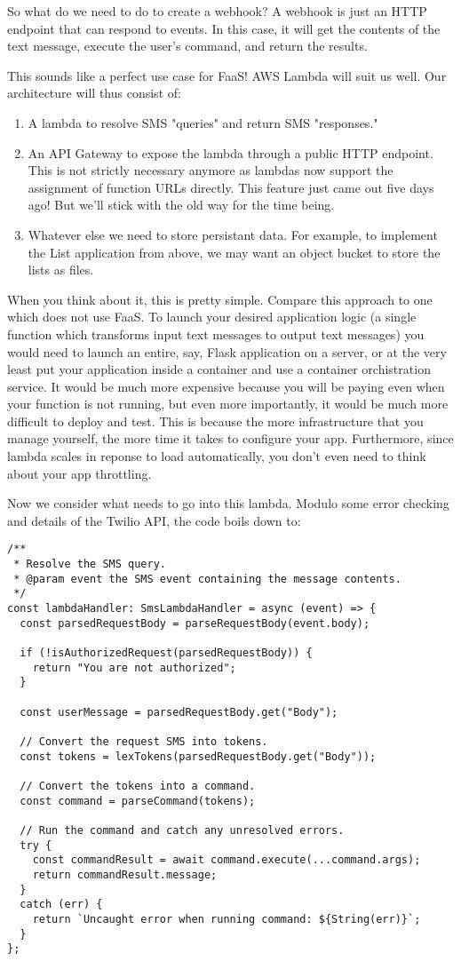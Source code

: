 \documentclass{article}
\begin{document}
So what do we need to do to create a webhook?
A webhook is just an HTTP endpoint that can respond to events.
In this case, it will get the contents of the text message, execute the user's command, and return the results.

This sounds like a perfect use case for FaaS!
AWS Lambda will suit us well.
Our architecture will thus consist of:

\begin{enumerate}
  \item A lambda to resolve SMS "queries" and return SMS "responses."
  \item An API Gateway to expose the lambda through a public HTTP endpoint. This is not strictly necessary anymore as lambdas now support the assignment of function URLs directly. This feature just came out five days ago! But we'll stick with the old way for the time being.
  \item Whatever else we need to store persistant data.
    For example, to implement the List application from above, we may want an object bucket to store the lists as files.
\end{enumerate}

When you think about it, this is pretty simple.
Compare this approach to one which does not use FaaS.
To launch your desired application logic (a single function which transforms input text messages to output text messages) you would need to launch an entire, say, Flask application on a server, or at the very least put your application inside a container and use a container orchistration service.
It would be much more expensive because you will be paying even when your function is not running, but even more importantly, it would be much more difficult to deploy and test.
This is because the more infrastructure that you manage yourself, the more time it takes to configure your app.
Furthermore, since lambda scales in reponse to load automatically, you don't even need to think about your app throttling.

Now we consider what needs to go into this lambda.
Modulo some error checking and details of the Twilio API, the code boils down to:

\begin{verbatim}
/**
 * Resolve the SMS query.
 * @param event the SMS event containing the message contents.
 */
const lambdaHandler: SmsLambdaHandler = async (event) => {
  const parsedRequestBody = parseRequestBody(event.body);

  if (!isAuthorizedRequest(parsedRequestBody)) {
    return "You are not authorized";
  }

  const userMessage = parsedRequestBody.get("Body");

  // Convert the request SMS into tokens.
  const tokens = lexTokens(parsedRequestBody.get("Body"));

  // Convert the tokens into a command.
  const command = parseCommand(tokens);

  // Run the command and catch any unresolved errors.
  try {
    const commandResult = await command.execute(...command.args);
    return commandResult.message;
  }
  catch (err) {
    return `Uncaught error when running command: ${String(err)}`;
  }
};
\end{verbatim}
\end{document}

